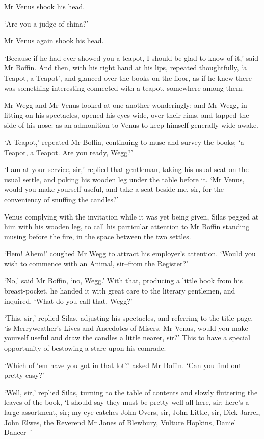 Mr Venus shook his head.

‘Are you a judge of china?’

Mr Venus again shook his head.

‘Because if he had ever showed you a teapot, I should be glad to know of
it,’ said Mr Boffin. And then, with his right hand at his lips, repeated
thoughtfully, ‘a Teapot, a Teapot’, and glanced over the books on the
floor, as if he knew there was something interesting connected with a
teapot, somewhere among them.

Mr Wegg and Mr Venus looked at one another wonderingly: and Mr Wegg, in
fitting on his spectacles, opened his eyes wide, over their rims, and
tapped the side of his nose: as an admonition to Venus to keep himself
generally wide awake.

‘A Teapot,’ repeated Mr Boffin, continuing to muse and survey the books;
‘a Teapot, a Teapot. Are you ready, Wegg?’

‘I am at your service, sir,’ replied that gentleman, taking his usual
seat on the usual settle, and poking his wooden leg under the table
before it. ‘Mr Venus, would you make yourself useful, and take a seat
beside me, sir, for the conveniency of snuffing the candles?’

Venus complying with the invitation while it was yet being given, Silas
pegged at him with his wooden leg, to call his particular attention to
Mr Boffin standing musing before the fire, in the space between the two
settles.

‘Hem! Ahem!’ coughed Mr Wegg to attract his employer’s attention. ‘Would
you wish to commence with an Animal, sir--from the Register?’

‘No,’ said Mr Boffin, ‘no, Wegg.’ With that, producing a little book
from his breast-pocket, he handed it with great care to the literary
gentlemen, and inquired, ‘What do you call that, Wegg?’

‘This, sir,’ replied Silas, adjusting his spectacles, and referring to
the title-page, ‘is Merryweather’s Lives and Anecdotes of Misers. Mr
Venus, would you make yourself useful and draw the candles a little
nearer, sir?’ This to have a special opportunity of bestowing a stare
upon his comrade.

‘Which of ‘em have you got in that lot?’ asked Mr Boffin. ‘Can you find
out pretty easy?’

‘Well, sir,’ replied Silas, turning to the table of contents and slowly
fluttering the leaves of the book, ‘I should say they must be pretty
well all here, sir; here’s a large assortment, sir; my eye catches John
Overs, sir, John Little, sir, Dick Jarrel, John Elwes, the Reverend Mr
Jones of Blewbury, Vulture Hopkins, Daniel Dancer--’

